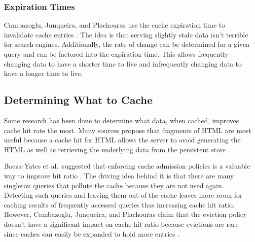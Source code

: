 \documentclass[12pt]{ucthesis}
\begin{document}
\subsubsection{Expiration Times}
Cambazoglu, Junqueira, and Plachouras use the cache expiration time to invalidate cache entries \cite{refreshingPerspectiveSearch}.
The idea is that serving slightly stale data isn't terrible for search engines.
Additionally, the rate of change can be determined for a given query and can be factored into the expiration time.
This allows frequently changing data to have a shorter time to live and infrequently changing data to have a longer time to live.

\subsection{Determining What to Cache}
Some research has been done to determine what data, when cached, improves cache hit rate the most.
Many sources propose that fragments of HTML are most useful because a cache hit for HTML allows the server to avoid generating the HTML as well as retrieving the underlying data from the persistent store \cite{comparisonOfCachingSolutions, scalableConsistentCaching, howBasecampGotSoFast}.

Baeza-Yates et al.\ suggested that enforcing cache admission policies is a valuable way to improve hit ratio \cite{cacheAdmissionPolicies}.
The driving idea behind it is that there are many singleton queries that pollute the cache because they are not used again.
Detecting such queries and leaving them out of the cache leaves more room for caching results of frequently accessed queries thus increasing cache hit ratio.
However, Cambazoglu, Junqueira, and Plachouras claim that the eviction policy doesn't have a significant impact on cache hit ratio because evictions are rare since caches can easily be expanded to hold more entries \cite{refreshingPerspectiveSearch}.
\end{document}
